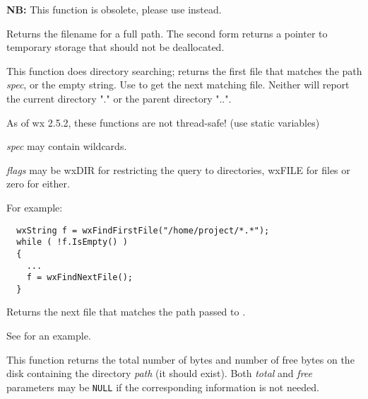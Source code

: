 {\bf NB:} This function is obsolete, please use
 instead.

Returns the filename for a full path. The second form returns a pointer to
temporary storage that should not be deallocated.


\label{wxfindfirstfile}


This function does directory searching; returns the first file
that matches the path {\it spec}, or the empty string. Use  to
get the next matching file. Neither will report the current directory "." or the
parent directory "..".


As of wx 2.5.2, these functions are not thread-safe! (use static variables)

{\it spec} may contain wildcards.

{\it flags} may be wxDIR for restricting the query to directories, wxFILE for files or zero for either.

For example:

\begin{verbatim}
  wxString f = wxFindFirstFile("/home/project/*.*");
  while ( !f.IsEmpty() )
  {
    ...
    f = wxFindNextFile();
  }
\end{verbatim}


\label{wxfindnextfile}


Returns the next file that matches the path passed to .

See  for an example.


\label{wxgetdiskspace}


This function returns the total number of bytes and number of free bytes on
the disk containing the directory {\it path} (it should exist). Both
{\it total} and {\it free} parameters may be {\tt NULL} if the corresponding
information is not needed.


